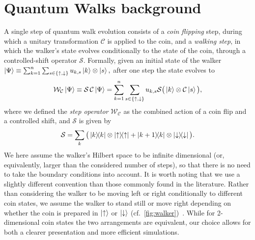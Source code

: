 \section{Quantum Walks background}
A single step of quantum walk evolution consists of a \emph{coin flipping} step, during which a unitary { transformation} $\mathcal C$ is applied to the coin, and a \emph{walking step}, in which the walker's state evolves conditionally to the state of the coin, through a controlled-shift operator $\mathcal S$.
Formally, given an initial state of the walker
$
	\ket\Psi \equiv \sum_{k=1}^n \sum_{s\in\{\uparrow,\downarrow\}}
	u_{k,s} \ket{k} \otimes \ket{s},
$
after one step the state evolves to
\begin{equation}
	\mathcal W_{\mathcal C} \ket\Psi \equiv
	\mathcal S \,\mathcal C \ket\Psi
	= \sum_{k=1}^n \sum_{s\in\{\uparrow,\downarrow\}}
	u_{k,s}
	\mathcal S \big( \ket{k} \otimes \mathcal C \ket{s} \big),
	\label{eq:step_operator_definition}
\end{equation}
where we defined the \emph{step operator} $\mathcal W_{\mathcal C}$ as the combined action of a coin flip and a controlled shift, and $\mathcal S$ is given by
\begin{equation}
	\mathcal S =
	\sum_k \big(
		\ketbra{k}{k} \otimes \ketbra{\uparrow}{\uparrow}
		+
		\ketbra{k + 1}{k} \otimes \ketbra{\downarrow}{\downarrow}
	\big).
	\label{eq:controlled_shift_operator}
\end{equation}
We here assume the walker's Hilbert space to be infinite dimensional (or, equivalently, larger than the considered number of steps), so that there is no need to take the boundary conditions into account.
It is worth noting that we use a slightly different convention than those commonly found in the literature. Rather than considering the walker to be moving left or right conditionally to different coin states, we assume the walker to stand still or move right depending on whether the coin is prepared in $\ket{\uparrow}$ or $\ket{\downarrow}$ (cf.~\cref{fig:walker})~\cite{hoyer2009faster, montero2013unidirectional,montero2015quantum}.
While for 2-dimensional coin states the two arrangements are equivalent, our choice allows for both a clearer presentation and more efficient simulations.


